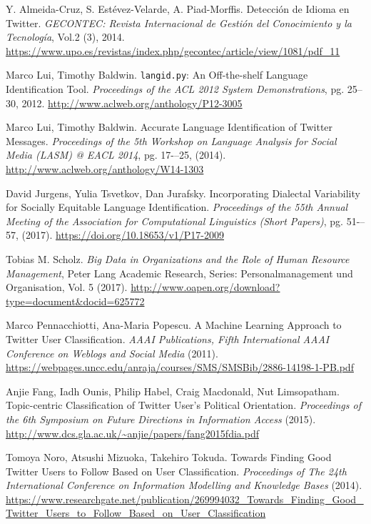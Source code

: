 \begin{thebibliography}{3}
 Y. Almeida-Cruz, S. Estévez-Velarde, A.  Piad-Morffis. Detección de Idioma en Twitter.
{\em GECONTEC: Revista Internacional de Gestión del Conocimiento y la Tecnología}, Vol.2 (3), 2014.
\url{https://www.upo.es/revistas/index.php/gecontec/article/view/1081/pdf_11}

 Marco Lui, Timothy Baldwin. {\tt langid.py}: An Off-the-shelf Language Identification Tool.
{\em Proceedings of the ACL 2012 System Demonstrations}, pg. 25--30, 2012.
\url{http://www.aclweb.org/anthology/P12-3005}

 Marco Lui, Timothy Baldwin. Accurate Language Identification of Twitter Messages. 
{\em Proceedings of the 5th Workshop on Language Analysis for Social Media (LASM) @ EACL 2014}, pg. 17-–25,
(2014). \url{http://www.aclweb.org/anthology/W14-1303}

 David Jurgens, Yulia Tsvetkov, Dan Jurafsky. Incorporating Dialectal Variability
for Socially Equitable Language Identification. 
{\em Proceedings of the 55th Annual Meeting of the Association for Computational Linguistics (Short Papers)}, 
pg. 51-–57, (2017). \url{https://doi.org/10.18653/v1/P17-2009}

 Tobias M. Scholz. {\em Big Data in Organizations and the Role of
Human Resource Management}, Peter Lang Academic Research, Series: Personalmanagement und
Organisation, Vol. 5 (2017). \url{http://www.oapen.org/download?type=document&docid=625772}

Marco Pennacchiotti, Ana-Maria Popescu. A Machine Learning Approach to Twitter User 
Classification. {\em AAAI Publications, Fifth International AAAI Conference on Weblogs and Social Media} (2011).
\url{https://webpages.uncc.edu/anraja/courses/SMS/SMSBib/2886-14198-1-PB.pdf }

 Anjie Fang, Iadh Ounis, Philip Habel, Craig Macdonald, Nut Limsopatham.
Topic-centric Classification of Twitter User’s Political Orientation. {\em Proceedings of the 
6th Symposium on Future Directions in Information Access} (2015).
\url{http://www.dcs.gla.ac.uk/~anjie/papers/fang2015fdia.pdf }

 Tomoya Noro, Atsushi Mizuoka, Takehiro Tokuda. 
Towards Finding Good Twitter Users to Follow Based on User Classification.
{\em Proceedings of The 24th International Conference on Information Modelling and Knowledge 
Bases} (2014). \url{https://www.researchgate.net/publication/269994032_Towards_Finding_Good_Twitter_Users_to_Follow_Based_on_User_Classification }


\end{thebibliography}
